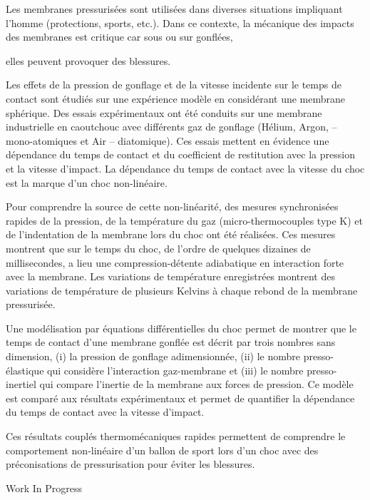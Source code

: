 {\normalsize
Les membranes pressurisées sont utilisées dans diverses situations impliquant l'homme (protections, sports, etc.). Dans ce contexte, la mécanique des impacts des membranes est critique car sous ou sur gonflées,



elles peuvent provoquer des blessures.







Les effets de la pression de gonflage et de la vitesse incidente sur le temps de contact sont étudiés sur une expérience modèle en considérant une membrane sphérique. Des essais expérimentaux ont été conduits sur une membrane industrielle en caoutchouc avec différents gaz de gonflage (Hélium, Argon, -- mono-atomiques et Air -- diatomique). Ces essais mettent en évidence une dépendance du temps de contact et du coefficient de restitution avec la pression et la vitesse d'impact. La dépendance du temps de contact avec la vitesse du choc est la marque d'un choc non-linéaire.



Pour comprendre la source de cette non-linéarité, des mesures synchronisées rapides de la pression, de la température du gaz (micro-thermocouples type K) et de l'indentation de la membrane lors du choc ont été réalisées. Ces mesures  montrent que sur le temps du choc, de l'ordre de quelques dizaines de millisecondes, a lieu une compression-détente adiabatique en interaction forte avec la membrane. Les variations de température enregistrées montrent des variations de température de plusieurs Kelvins à chaque rebond de la membrane pressurisée.







Une modélisation par équations différentielles du choc permet de montrer que le temps de contact d'une membrane gonflée est décrit par trois nombres sans dimension, (i) la pression de gonflage adimensionnée, (ii) le nombre presso-élastique qui considère l'interaction gaz-membrane et (iii) le nombre presso-inertiel qui compare l'inertie de la membrane aux forces de pression. Ce modèle est comparé aux résultats expérimentaux et permet de quantifier la dépendance du temps de contact avec la vitesse d'impact.







Ces résultats couplés thermomécaniques rapides permettent de comprendre le comportement non-linéaire d'un ballon de sport lors d'un choc avec des préconisations de pressurisation pour éviter les blessures.

 \vfill Work In Progress

}
 
